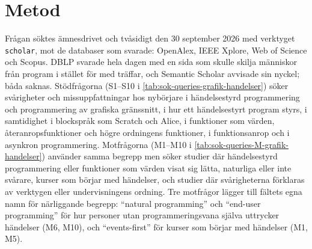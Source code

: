 \section{Metod}
\label{sec:handelser-metod-grafik}

Frågan söktes ämnesdrivet och tvåsidigt den 30 september 2026 med
verktyget \texttt{scholar}, mot de databaser som svarade: OpenAlex, IEEE
Xplore, Web of Science och Scopus.  DBLP svarade hela dagen med en sida
som skulle skilja människor från program i stället för med träffar, och
Semantic Scholar avvisade sin nyckel; båda saknas.  Stödfrågorna
(S1--S10 i \cref{tab:sok-queries-grafik-handelser}) söker svårigheter
och missuppfattningar hos nybörjare i händelsestyrd programmering och
programmering av grafiska gränssnitt, i hur ett händelsestyrt program
styrs, i samtidighet i blockspråk som Scratch och Alice, i funktioner
som värden, återanropsfunktioner och högre ordningens funktioner, i
funktionsanrop och i asynkron programmering.  Motfrågorna (M1--M10 i
\cref{tab:sok-queries-M-grafik-handelser})
använder samma begrepp men söker studier där händelsestyrd
programmering eller funktioner som värden visat sig lätta, naturliga
eller inte svårare, kurser som börjar med händelser, och studier där
svårigheterna förklaras av verktygen eller undervisningens ordning.
Tre motfrågor lägger till fältets egna namn för närliggande begrepp:
\enquote{natural programming} och \enquote{end-user programming} för hur
personer utan programmeringsvana själva uttrycker händelser (M6, M10),
och \enquote{events-first} för kurser som börjar med händelser (M1, M5).


